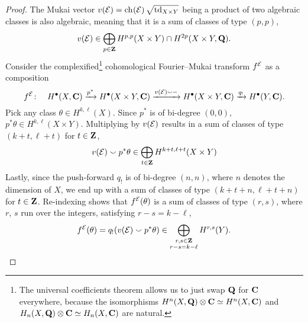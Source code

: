 \begin{proof}
    The Mukai vector $v(\E) = \ch[]{\E}\sqrt{\tdclass{X \times Y}}$ being a product of two algebraic classes is also algebraic, meaning that it is a sum of classes of type $(p,p)$, \ie
    \[
        v(\mathcal E) \in \bigoplus_{p \in \mathbf Z} H^{p,p}(X \times Y) \cap H^{2p}(X \times Y, \mathbf Q).
    \] 
    Consider the complexified\footnote{
        The universal coefficients theorem allows us to just swap $\mathbf Q$ for $\mathbf C$ everywhere, because the isomorphisms $H^{n}(X, \mathbf Q)\otimes \mathbf C \simeq H^{n}(X, \mathbf C)$ and $H_n(X, \mathbf Q)\otimes \mathbf C \simeq H_n(X, \mathbf C)$ are natural. 
    } cohomological Fourier--Mukai transform $f^{\mathcal E}$ as a composition
    \[  
        f^{\mathcal E} \colon \quad H^{\bullet}(X, \mathbf C) \xrightarrow{p^*} H^{\bullet}(X \times Y, \mathbf C) \xrightarrow{v(\mathcal E) \smallsmile -} H^{\bullet}(X \times Y, \mathbf C) \xrightarrow{q_!} H^{\bullet}(Y, \mathbf C).
    \]
    Pick any class $\theta \in H^{k, \ell}(X)$. Since $p^*$ is of bi-degree $(0,0)$, $p^*\theta \in H^{k,\ell}(X \times Y)$. Multiplying by $v(\mathcal E)$ results in a sum of classes of type $(k + t, \ell + t)$ for $t \in \mathbf Z$, \ie
    \[
        v(\mathcal E) \smallsmile p^*\theta \in \bigoplus_{t \in \mathbf Z}H^{k + t, \ell + t}(X \times Y)
    \]
    Lastly, since the push-forward $q_!$ is of bi-degree $(n,n)$, where $n$ denotes the dimension of $X$, we end up with a sum of classes of type $(k + t + n, \ell + t + n)$ for $t \in \mathbf Z$. Re-indexing shows that $f^{\mathcal E}(\theta)$ is a sum of classes of type $(r,s)$, where $r$, $s$ run over the integers, satisfying $r - s = k - \ell$, \ie
    \[
        f^{\mathcal E}(\theta) = q_!(v(\mathcal E) \smallsmile p^*\theta) \in \bigoplus_{\substack{r,s\in \mathbf Z \\ r-s = k - \ell}}H^{r,s}(Y). \qedhere
    \]
\end{proof}